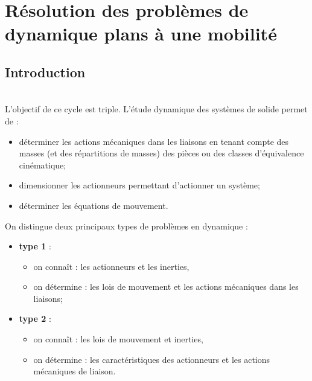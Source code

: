 
\setchapterpreamble[u]{\margintoc}

\chapter{Résolution des problèmes de dynamique plans à une mobilité}




\def\xxnumchapitre{Chapitre 1 \vspace{.2cm}}
\def\xxchapitre{\hspace{.12cm} }


\section{Introduction}
\begin{obj} ~\\
L'objectif de ce cycle est triple. L'étude dynamique des systèmes de solide permet de :
\begin{itemize}
\item déterminer les actions mécaniques dans les liaisons en tenant compte des masses (et des répartitions de masses) des pièces ou des classes d'équivalence cinématique;
\item dimensionner les actionneurs permettant d'actionner un système; 
\item déterminer les équations de mouvement.
\end{itemize}
\end{obj}



On distingue deux principaux types de problèmes en dynamique : 
\begin{itemize}
\item \textbf{type 1} :
\begin{itemize}
\item on connaît : les actionneurs et les inerties,
\item on détermine : les lois de mouvement et les actions mécaniques dans les liaisons;
\end{itemize} 
\item \textbf{type 2} :
\begin{itemize}
\item on connaît : les lois de mouvement et inerties,
\item on détermine : les caractéristiques des actionneurs et les actions mécaniques de liaison.
\end{itemize}
\end{itemize}




